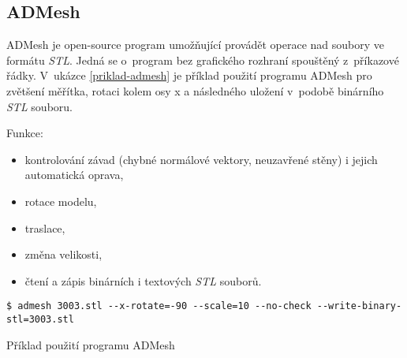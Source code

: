 \subsection{ADMesh}\label{podsekce-admesh}
ADMesh \autocite{ADMesh} je open-source program umožňující provádět operace nad soubory ve formátu \textit{\gls{STL}}. Jedná se o~program bez grafického rozhraní spouštěný z~příkazové řádky. V~ukázce \ref{priklad-admesh} je příklad použití programu ADMesh pro zvětšení měřítka, rotaci kolem osy x a následného uložení v~podobě binárního \textit{\gls{STL}} souboru.

Funkce:
\begin{itemize}
    \item kontrolování závad (chybné normálové vektory, neuzavřené stěny) i jejich automatická oprava,
    \item rotace modelu,
    \item traslace,
    \item změna velikosti,
    \item čtení a zápis binárních i textových \textit{\gls{STL}} souborů.
\end{itemize}

\begin{listing}[htbp]
        \begin{verbatim}
$ admesh 3003.stl --x-rotate=-90 --scale=10 --no-check --write-binary-stl=3003.stl
        \end{verbatim}
    \caption{Příklad použití programu ADMesh \label{priklad-admesh}}
\end{listing}

